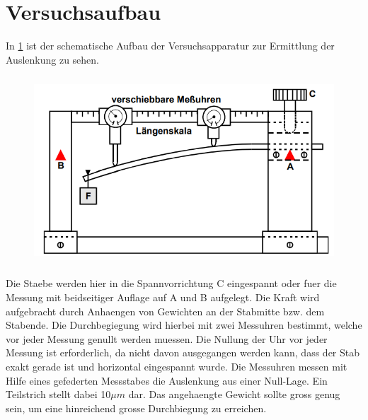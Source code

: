\section{Versuchsaufbau}
In \ref{Fig:Aufbau} ist der schematische Aufbau der Versuchsapparatur zur Ermittlung der Auslenkung zu sehen.
\begin{figure}[H]
    \centering
    \captionsetup{justification=centering}
    \includegraphics[height=7cm]{"Aufbau_Biegung.png"}
    \label{Fig:Aufbau}
\end{figure}
Die Staebe werden hier in die Spannvorrichtung C eingespannt oder fuer die Messung mit beidseitiger Auflage auf A und B aufgelegt. Die Kraft wird aufgebracht durch Anhaengen von Gewichten an der Stabmitte bzw. dem Stabende. Die Durchbegiegung wird hierbei mit zwei Messuhren bestimmt, welche vor jeder Messung genullt werden muessen. Die Nullung der Uhr vor jeder Messung ist erforderlich, da nicht davon ausgegangen werden kann, dass der Stab exakt gerade ist und horizontal eingespannt wurde. Die Messuhren messen mit Hilfe eines gefederten Messstabes die Auslenkung aus einer Null-Lage. Ein Teilstrich stellt dabei 10$\mu m$ dar. Das angehaengte Gewicht sollte gross genug sein, um eine hinreichend grosse Durchbiegung zu erreichen.